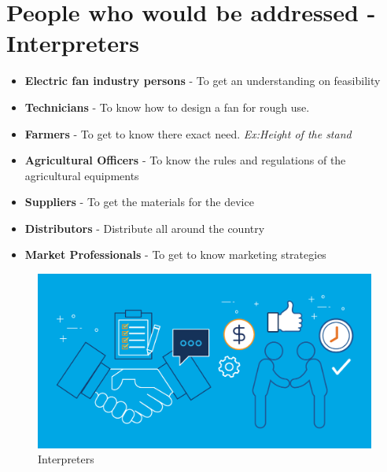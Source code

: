 \documentclass[12pt]{article}
\begin{document}
\section{People who would be addressed - Interpreters}

\begin{itemize}
    \item \textbf{Electric fan industry persons} - To get an understanding on feasibility
    \item \textbf{Technicians} - To know how to design a fan for rough use. 
    \item \textbf{Farmers} - To get to know there exact need. \textit{Ex:Height of the stand}
    \item \textbf{Agricultural Officers} - To know the rules and regulations of the agricultural equipments
    \item \textbf{Suppliers} - To get the materials for the device
    \item \textbf{Distributors} - Distribute all around the country
    \item \textbf{Market Professionals} - To get to know marketing strategies
    
\end{itemize}

\vspace{3 cm}
\begin{figure}[h!]
  \centering
  \includegraphics[width=\linewidth]{interaction.png}
  \caption{Interpreters}
  \label{fig:Interpreters}
\end{figure}
\pagebreak
\end{document}
